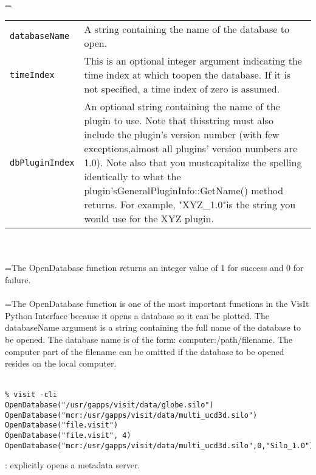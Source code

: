 \documentclass[10pt,a4paper]{report}
\begin{document}
 \\ 
\hangindent=\parindent 
\begin{tabular}{lp{9cm}}
\verb!databaseName! & A string containing the name of the database to open. \\
\verb!timeIndex! & This is an optional integer argument indicating the time index at which toopen the database. If it is not specified, a time index of zero is assumed. \\
\verb!dbPluginIndex! & An optional string containing the name of the plugin to use. Note that thisstring must also include the plugin's version number (with few exceptions,almost all plugins' version numbers are 1.0). Note also that you mustcapitalize the spelling identically to what the plugin'sGeneralPluginInfo::GetName() method returns. For example, "XYZ\_1.0"is the string you would use for the XYZ plugin. \\
\end{tabular} \\[-2mm]


 \\ 
\hangindent=\parindent The OpenDatabase function returns an integer value of 1 for success and 0 for failure. \\[-3mm] 

 \\ 
\hangindent=\parindent The OpenDatabase function is one of the most important functions in the VisIt Python Interface because it opens a database so it can be plotted. The databaseName argument is a string containing the full name of the database to be opened. The database name is of the form: computer:/path/filename. The computer part of the filename can be omitted if the database to be opened resides on the local computer. \\[-3mm] 

\\[-6mm]
\begin{verbatim}% visit -cli
OpenDatabase("/usr/gapps/visit/data/globe.silo")
OpenDatabase("mcr:/usr/gapps/visit/data/multi_ucd3d.silo")
OpenDatabase("file.visit")
OpenDatabase("file.visit", 4)
OpenDatabase("mcr:/usr/gapps/visit/data/multi_ucd3d.silo",0,"Silo_1.0")
\end{verbatim}
\newpage


{}
: explicitly opens a metadata server.\\[-3mm]
\end{document}
